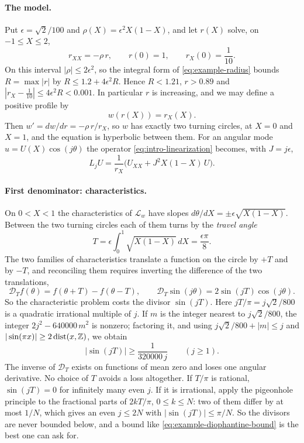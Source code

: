 \paragraph{The model.}
Put $\epsilon=\sqrt2/100$ and $\rho(X)=\epsilon^2X(1-X)$, and let
$r(X)$ solve, on $-1\le X\le2$,
\begin{equation}\label{eq:example-radius}
 r_{XX}=-\rho\,r,\qquad r(0)=1,\qquad r_X(0)=\frac1{10}.
\end{equation}
On this interval $|\rho|\le2\epsilon^2$, so the integral form of
\eqref{eq:example-radius} bounds $R=\max|r|$ by
$R\le1.2+4\epsilon^2R$. Hence $R<1.21$, $r>0.89$ and
$|r_X-\tfrac1{10}|\le4\epsilon^2R<0.001$. In particular $r$ is
increasing, and we may define a positive profile by
\[
 w(r(X))=r_X(X).
\]
Then $w'=dw/dr=-\rho\,r/r_X$, so $w$ has exactly two turning circles,
at $X=0$ and $X=1$, and the equation is hyperbolic between them. For an
angular mode $u=U(X)\cos(j\theta)$ the operator
\eqref{eq:intro-linearization} becomes, with $J=j\epsilon$,
\begin{equation}\label{eq:example-mode}
 L_jU=\frac1{r_X}\bigl(U_{XX}+J^2X(1-X)\,U\bigr).
\end{equation}

\paragraph{First denominator: characteristics.}
On $0<X<1$ the characteristics of $\mathscr L_w$ have slopes
$d\theta/dX=\pm\epsilon\sqrt{X(1-X)}$. Between the two turning circles
each of them turns by the \emph{travel angle}
\begin{equation}\label{eq:example-action}
 T=\epsilon\int_0^1\sqrt{X(1-X)}\,dX=\frac{\epsilon\pi}8 .
\end{equation}
The two families of characteristics translate a function on the circle
by $+T$ and by $-T$, and reconciling them requires inverting the
difference of the two translations,
\begin{equation}\label{eq:example-circle-operator}
 \mathcal D_Tf(\theta)=f(\theta+T)-f(\theta-T),\qquad
 \mathcal D_T\sin(j\theta)=2\sin(jT)\cos(j\theta).
\end{equation}
So the characteristic problem costs the divisor $\sin(jT)$. Here
$jT/\pi=j\sqrt2/800$ is a quadratic irrational multiple of $j$. If $m$
is the integer nearest to $j\sqrt2/800$, the integer
$2j^2-640000\,m^2$ is nonzero; factoring it, and using
$j\sqrt2/800+|m|\le j$ and $|\sin(\pi x)|\ge2\operatorname{dist}(x,\mathbb Z)$, we obtain
\begin{equation}\label{eq:example-diophantine-bound}
 |\sin(jT)|\ge\frac1{320000\,j}\qquad(j\ge1).
\end{equation}
The inverse of $\mathcal D_T$ exists on functions of mean zero and
loses one angular derivative. No choice of $T$ avoids a loss
altogether. If $T/\pi$ is rational, $\sin(jT)=0$ for infinitely many
even $j$. If it is irrational, apply the pigeonhole principle to the
fractional parts of $2kT/\pi$, $0\le k\le N$: two of them differ by
at most $1/N$, which gives an even $j\le2N$ with
$|\sin(jT)|\le\pi/N$. So the divisors are never bounded below, and
a bound like \eqref{eq:example-diophantine-bound} is the best one
can ask for.

